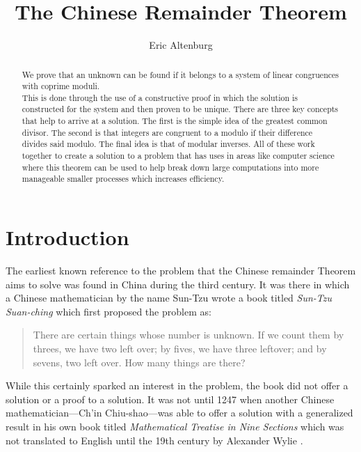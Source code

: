 \documentclass[12pt,a4paper,reqno,parskip=full]{amsart}
\numberwithin{equation}{section}
\theoremstyle{plain}
\theoremstyle{definition}
\begin{document}
\title{The Chinese Remainder Theorem}

\author{Eric Altenburg}

\begin{abstract}
We prove that an unknown can be found if it belongs to a system of linear congruences with coprime moduli.\\

This is done through the use of a constructive proof in which the solution is constructed for the system and then proven to be unique. There are three key concepts that help to arrive at a solution. The first is the simple idea of the greatest common divisor. The second is that integers are congruent to a modulo if their difference divides said modulo. The final idea is that of modular inverses. All of these work together to create a solution to a problem that has uses in areas like computer science where this theorem can be used to help break down large computations into more manageable smaller processes which increases efficiency.
\end{abstract}

\maketitle



\section{Introduction}

The earliest known reference to the problem that the Chinese remainder Theorem aims to solve was found in China during the third century. It was there in which a Chinese mathematician by the name Sun-Tzu wrote a book titled \textit{Sun-Tzu Suan-ching} which first proposed the problem as:

\begin{quote}
	There are certain things whose number is unknown. If we count them by threes, we have two left over; by fives, we have three leftover; and by sevens, two left over. How many things are there? \cite{elements-of-the-theory-of-number}
\end{quote}

While this certainly sparked an interest in the problem, the book did not offer a solution or a proof to a solution. It was not until 1247 when another Chinese mathematician—Ch'in Chiu-shao—was able to offer a solution with a generalized result in his own book titled \textit{Mathematical Treatise in Nine Sections} which was not translated to English until the 19th century by Alexander Wylie \cite{katz}. 
\end{document}
